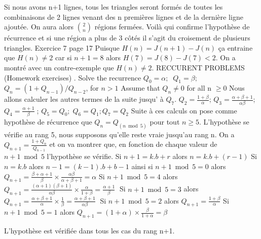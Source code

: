 \documentclass[9pt]{amsart}
\begin{document}
Si nous avons n+1 lignes, tous les triangles seront form\'{e}s de toutes les combinaisons de 2 lignes 
venant des n premi\`{e}res lignes et de la derni\`{e}re ligne ajout\'{e}e. 
On aura alors $\binom{2}{n}$ r\'{e}gions ferm\'{e}es. Voil\`{a} qui confirme l'hypoth\`{e}se de r\'{e}currence et si une r\'{e}gion a plus de 3 côt\'{e}s
il s'agit du croisement de plusieurs triangles. 
 \newline\newline
Exercice 7 page 17 \newline
Puisque $H(n) = J(n+1) - J(n)$ ça entraine que $H(n) \neq 2$ car si $n+1 = 8$ alors $H(7) = J(8) - J(7) < 2$.\newline
On a montr\'{e} avec un contre-exemple que  $H(n) \neq 2$.
\newline\newline
RECCURENT PROBLEMS (Homework exercises)
\newline{}. Solve the recurrence 
$Q_{0} = \alpha; \;\; Q_{1}= \beta;$\newline 
$Q_{n} = (1 + Q_{n-1}) / Q_{n-2}$, for $n > 1$
\newline Assume that $Q_{n}  \neq 0$ for all n $\geq 0$\newline\newline
Nous allons calculer les autres termes de la suite jusqu' \`{a} $Q_{7}$.\newline
$Q_{2} = \frac{1+\beta}{\alpha}$;\; $Q_{3} = \frac{\alpha+\beta+1}{\alpha\beta}$;\; $Q_{4}=\frac{\alpha+1}{\beta}\;$; $Q_{5}= Q_{0};\; Q_{6} = Q_{1}; Q_{7} = Q_{2}$ 
\newline\newline Suite \`{a} ces calculs on pose comme hypoth\`{e}se de r\'{e}currence que $Q_{n} = Q_{(n\bmod5)}$ pour tout $n \geq 5$. L'hypoth\`{e}se se v\'{e}rifie au rang 5, nous supposons qu'elle reste vraie jusqu'au rang n. On a $Q_{n+1} = \frac{1 + Q_{n}}{Q_{n-1}}$ et on va montrer que, en fonction de chaque valeur de $n+1\bmod5$ l'hypoth\`{e}se se v\'{e}rifie. \newline\newline
Si $n+1 = k.b + r$ alors $n = k.b + (r-1)$ \newline
Si $n = k.b$ alors $n-1 = (k-1).b + b - 1$\newline
ainsi si $n+1 \bmod 5 = 0$ alors $Q_{n+1} = \frac{\beta+\alpha+1}{\beta}\times\frac{\alpha\beta}{\alpha+\beta+1} = \alpha$\newline
Si $n+1 \bmod 5 = 4$ alors $Q_{n+1} = \frac{(\alpha+1)(\beta+1)}{\alpha\beta}\times\frac{\alpha}{1 + \beta} = \frac{\alpha+1}{\beta}\;$\newline
Si $n+1 \bmod 5 = 3$ alors  $Q_{n+1} = \frac{\alpha+\beta+1}{\alpha}\times\frac{1}{\beta} = \frac{\alpha+\beta+1}{\alpha\beta}\;$\newline
Si $n+1 \bmod 5 = 2$ alors  $Q_{n+1} = \frac{1+\beta}{\alpha}$\newline
Si $n+1 \bmod 5 = 1$ alors  $Q_{n+1} = (1 + \alpha)\times\frac{\beta}{1+\alpha} = \beta$\newline\newline

L'hypothèse est vérifiée dans tous les cas du rang n+1.
\end{document}

